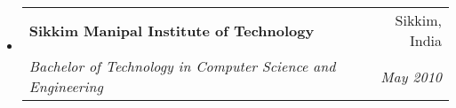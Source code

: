 \documentclass[letterpaper,11pt]{article}
\makeatletter
\newcommand{\resitem}[1]{\item #1 \vspace{-2pt}}
\newcommand{\ressubheading}[4]{
\begin{tabular*}{6.5in}{l@{\extracolsep{\fill}}r}
		\textbf{#1} & #2 \\
		\textit{#3} & \textit{#4} \\
\end{tabular*}\vspace{-6pt}}
\makeatother
\begin{document}
\begin{itemize}
{\begin{itemize}
				\end{itemize}
				}
		\item
			\ressubheading{{Sikkim Manipal Institute of Technology}}{Sikkim, India}{{Bachelor of Technology in Computer Science and Engineering}}{May 2010}


	\end{itemize} %
\end{document}
